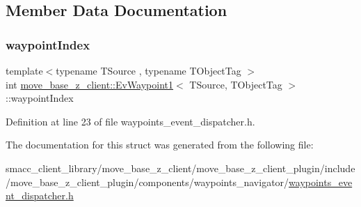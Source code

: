 \subsection{Member Data Documentation}
\mbox{\label{structmove__base__z__client_1_1EvWaypoint1_a7313e1714012bad9c3da07660fe70b91}} 
\subsubsection{\texorpdfstring{waypoint\+Index}{waypointIndex}}
{\footnotesize\ttfamily template$<$typename T\+Source , typename T\+Object\+Tag $>$ \\
int \hyperlink{structmove__base__z__client_1_1EvWaypoint1}{move\+\_\+base\+\_\+z\+\_\+client\+::\+Ev\+Waypoint1}$<$ T\+Source, T\+Object\+Tag $>$\+::waypoint\+Index}



Definition at line 23 of file waypoints\+\_\+event\+\_\+dispatcher.\+h.



The documentation for this struct was generated from the following file\+:\begin{DoxyCompactItemize}
\item 
smacc\+\_\+client\+\_\+library/move\+\_\+base\+\_\+z\+\_\+client/move\+\_\+base\+\_\+z\+\_\+client\+\_\+plugin/include/move\+\_\+base\+\_\+z\+\_\+client\+\_\+plugin/components/waypoints\+\_\+navigator/\hyperlink{waypoints__event__dispatcher_8h}{waypoints\+\_\+event\+\_\+dispatcher.\+h}\end{DoxyCompactItemize}
